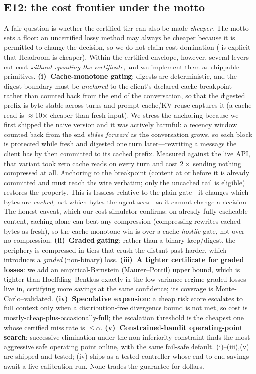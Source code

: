 \documentclass[11pt]{article}
\begin{document}
\subsection{E12: the cost frontier under the motto}
\label{sec:e12}

A fair question is whether the certified tier can also be made \emph{cheaper}. The motto sets
a floor: an uncertified lossy method may always be cheaper because it is permitted to change
the decision, so we do not claim cost-domination ( is explicit that Headroom is
cheaper). Within the certified envelope, however, several levers cut cost \emph{without
spending the certificate}, and we implement them as shippable primitives.
\textbf{(i)~Cache-monotone gating}: digests are deterministic, and the digest boundary must be
\emph{anchored} to the client's declared cache breakpoint rather than counted back from the end
of the conversation, so that the digested prefix is byte-stable across turns and prompt-cache/KV
reuse captures it (a cache read is $\approx$10$\times$ cheaper than fresh input). We stress the
anchoring because we first shipped the naive version and it was actively harmful: a recency
window counted back from the end \emph{slides forward} as the conversation grows, so each block
is protected while fresh and digested one turn later---rewriting a message the client has by
then committed to its cached prefix. Measured against the live API, that variant took zero cache
reads on every turn and cost $2\times$ sending nothing compressed at all. Anchoring to the
breakpoint (content at or before it is already committed and must reach the wire verbatim; only
the uncached tail is eligible) restores the property. This is lossless
relative to the plain gate---it changes which bytes are \emph{cached}, not which bytes the
agent sees---so it cannot change a decision. The honest caveat, which our cost simulator
confirms: on already-fully-cacheable content, caching alone can beat any compression
(compressing rewrites cached bytes as fresh), so the cache-monotone win is over a
cache-\emph{hostile} gate, not over no compression.
\textbf{(ii)~Graded gating}: rather than a binary keep/digest, the periphery is compressed in
tiers that crush the distant past harder, which introduces a \emph{graded} (non-binary) loss.
\textbf{(iii)~A tighter certificate for graded losses}: we add an empirical-Bernstein
(Maurer--Pontil) upper bound, which is tighter than Hoeffding--Bentkus exactly in the
low-variance regime graded losses live in, certifying more savings at the same confidence; its
coverage is Monte-Carlo--validated.
\textbf{(iv)~Speculative expansion}: a cheap risk score escalates to full context only when a
distribution-free divergence bound is not met, so cost is mostly-cheap-plus-occasionally-full;
the escalation threshold is the cheapest one whose certified miss rate is $\le\alpha$.
\textbf{(v)~Constrained-bandit operating-point search}: successive elimination under the
non-inferiority constraint finds the most aggressive safe operating point online, with the same
fail-safe default. (i)--(iii),(v) are shipped and tested; (iv) ships as a tested controller
whose end-to-end savings await a live calibration run. None trades the guarantee for dollars.
\end{document}

